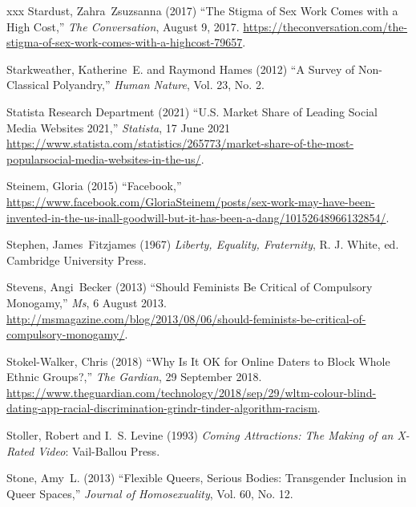 \documentclass[]{jlreq} \usepackage{mystyle}
\begin{document}
\begin{thebibliography}{xxx}
Stardust, Zahra~Zsuzsanna (2017) ``The Stigma of Sex Work Comes with a High
  Cost,'' \emph{The Conversation}, August 9, 2017.
  \url{https://theconversation.com/the-stigma-of-sex-work-comes-with-a-highcost-79657}.

Starkweather, Katherine~E. and Raymond Hames (2012) ``A Survey of Non-Classical
  Polyandry,'' \textit{ Human Nature}, Vol. 23, No. 2.

{Statista Research Department} (2021) ``U.S. Market Share of Leading Social
  Media Websites 2021,'' \emph{Statista}, 17 June 2021
  \url{https://www.statista.com/statistics/265773/market-share-of-the-most-popularsocial-media-websites-in-the-us/}.

Steinem, Gloria (2015) ``Facebook,''
  \url{https://www.facebook.com/GloriaSteinem/posts/sex-work-may-have-been-invented-in-the-us-inall-goodwill-but-it-has-been-a-dang/10152648966132854/}.

Stephen, James~Fitzjames (1967)  \emph{Liberty, Equality, Fraternity}, R. J.
  White, ed. Cambridge University Press.

Stevens, Angi~Becker (2013) ``Should Feminists Be Critical of Compulsory
  Monogamy,'' \emph{Ms}, 6 August 2013.
  \url{http://msmagazine.com/blog/2013/08/06/should-feminists-be-critical-of-compulsory-monogamy/}.

Stokel-Walker, Chris (2018) ``Why Is It OK for Online Daters to Block Whole
  Ethnic Groups?,'' \emph{The Gardian}, 29 September 2018.
  \url{https://www.theguardian.com/technology/2018/sep/29/wltm-colour-blind-dating-app-racial-discrimination-grindr-tinder-algorithm-racism}.

Stoller, Robert and I.~S. Levine (1993)  \textit{ Coming Attractions: The
  Making of an X-Rated Video}: Vail-Ballou Press.

Stone, Amy~L. (2013) ``Flexible Queers, Serious Bodies: Transgender Inclusion
  in Queer Spaces,'' \textit{ Journal of Homosexuality}, Vol. 60, No. 12.


\end{thebibliography}
\end{document}
